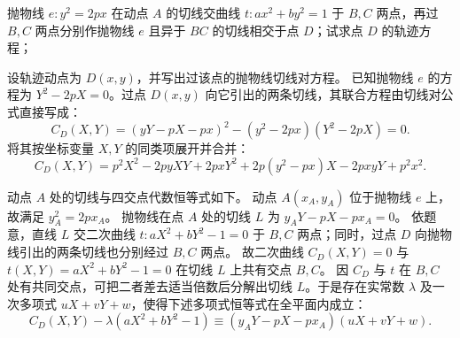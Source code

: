\begin{example}
抛物线 $e: y^2 = 2px$ 在动点 $A$ 的切线交曲线 $t: ax^2 + by^2 = 1$ 于 $B,C$ 两点，再过 $B,C$ 两点分别作抛物线 $e$ 且异于 $BC$ 的切线相交于点 $D$；试求点 $D$ 的轨迹方程；
\end{example}
\begin{solution}
设轨迹动点为 $D(x, y)$，并写出过该点的抛物线切线对方程。
已知抛物线 $e$ 的方程为 $Y^2 - 2pX = 0$。过点 $D(x, y)$ 向它引出的两条切线，其联合方程由切线对公式直接写成：
\[ C_D(X, Y) = (y Y - pX - px)^2 - (y^2 - 2px)(Y^2 - 2pX) = 0. \]
将其按坐标变量 $X, Y$ 的同类项展开并合并：
\[ C_D(X, Y) = p^2 X^2 - 2py XY + 2px Y^2 + 2p(y^2 - px)X - 2pxy Y + p^2 x^2. \]

动点 $A$ 处的切线与四交点代数恒等式如下。
动点 $A(x_A, y_A)$ 位于抛物线 $e$ 上，故满足 $y_A^2 = 2px_A$。
抛物线在点 $A$ 处的切线 $L$ 为 $y_A Y - pX - px_A = 0$。
依题意，直线 $L$ 交二次曲线 $t: aX^2 + bY^2 - 1 = 0$ 于 $B, C$ 两点；同时，过点 $D$ 向抛物线引出的两条切线也分别经过 $B, C$ 两点。
故二次曲线 $C_D(X, Y) = 0$ 与 $t(X, Y) = aX^2 + bY^2 - 1 = 0$ 在切线 $L$ 上共有交点 $B, C$。
因 $C_D$ 与 $t$ 在 $B,C$ 处有共同交点，可把二者差去适当倍数后分解出切线 $L$。于是存在实常数 $\lambda$ 及一次多项式 $uX+vY+w$，使得下述多项式恒等式在全平面内成立：
\[ C_D(X, Y) - \lambda (aX^2 + bY^2 - 1) \equiv (y_A Y - pX - px_A)(uX + vY + w). \]


\end{solution}
